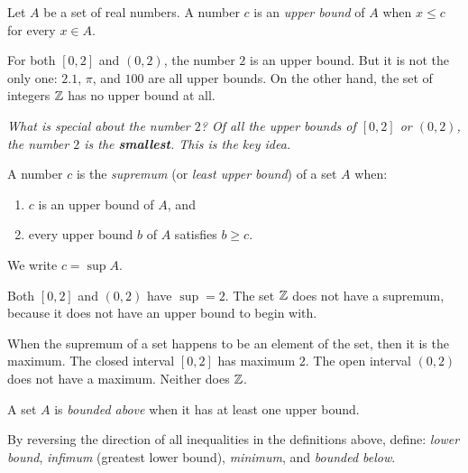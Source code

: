 \begin{definition}
\label{def:7-3}
Let $A$ be a set of real numbers.  A number $c$ is an \emph{upper bound} of $A$ when $x \le c$ for every $x \in A$.
\end{definition}

\begin{example}
\label{ex:7-4}
For both $[0,2]$ and $(0,2)$, the number $2$ is an upper bound.  But it is not the only one: $2.1$, $\pi$, and $100$ are all upper bounds.  On the other hand, the set of integers $\mathbb{Z}$ has no upper bound at all.
\end{example}

\textit{What is special about the number $2$?  Of all the upper bounds of $[0,2]$ or $(0,2)$, the number $2$ is the \textbf{smallest}.  This is the key idea.}

\begin{definition}
\label{def:7-4}
A number $c$ is the \emph{supremum} (or \emph{least upper bound}) of a set $A$ when:
\begin{enumerate}[label=(\roman*)]
  \item $c$ is an upper bound of $A$, and
  \item every upper bound $b$ of $A$ satisfies $b \ge c$.
\end{enumerate}
We write $c = \sup A$.
\end{definition}

\begin{example}
\label{ex:7-5}
Both $[0,2]$ and $(0,2)$ have $\sup = 2$.  The set $\mathbb{Z}$ does not have a supremum, because it does not have an upper bound to begin with.
\end{example}

\begin{remark}
When the supremum of a set happens to be an element of the set, then it is the maximum.  The closed interval $[0,2]$ has maximum $2$.  The open interval $(0,2)$ does not have a maximum.  Neither does $\mathbb{Z}$.
\end{remark}

\begin{definition}
\label{def:7-5}
A set $A$ is \emph{bounded above} when it has at least one upper bound.
\end{definition}

\begin{remark}
By reversing the direction of all inequalities in the definitions above, define: \emph{lower bound}, \emph{infimum} (greatest lower bound), \emph{minimum}, and \emph{bounded below}.
\end{remark}

